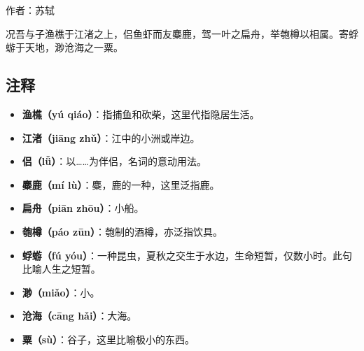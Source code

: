 作者：苏轼

\medskip

\noindent 况吾与子渔樵于江渚之上，侣鱼虾而友麋鹿，驾一叶之扁舟，举匏樽以相属。寄蜉蝣于天地，渺沧海之一粟。

\subsection*{注释}

\begin{itemize}[leftmargin=*]
    \item \textbf{渔樵（yú qiáo）}：指捕鱼和砍柴，这里代指隐居生活。
    \item \textbf{江渚（jiāng zhǔ）}：江中的小洲或岸边。
    \item \textbf{侣（lǚ）}：以……为伴侣，名词的意动用法。
    \item \textbf{麋鹿（mí lù）}：麋，鹿的一种，这里泛指鹿。
    \item \textbf{扁舟（piān zhōu）}：小船。
    \item \textbf{匏樽（páo zūn）}：匏制的酒樽，亦泛指饮具。
    \item \textbf{蜉蝣（fú yóu）}：一种昆虫，夏秋之交生于水边，生命短暂，仅数小时。此句比喻人生之短暂。
    \item \textbf{渺（miǎo）}：小。
    \item \textbf{沧海（cāng hǎi）}：大海。
    \item \textbf{粟（sù）}：谷子，这里比喻极小的东西。
\end{itemize}
